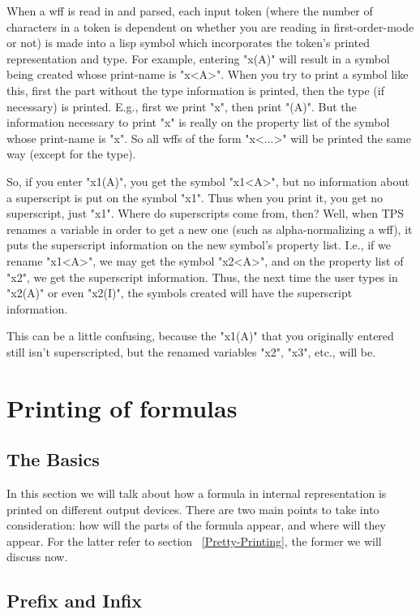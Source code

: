 When a wff is read in and parsed, each input token (where the number
of characters in a token is dependent on whether you are reading in
first-order-mode or not) is made into a lisp symbol which incorporates
the token's printed representation and type.  For example, entering
"x(A)" will result in a symbol being created whose print-name is
"x<A>".  When you try to print a symbol like this, first the part
without the type information is printed, then the type (if necessary)
is printed.  E.g., first we print "x", then print "(A)".  But the
information necessary to print "x" is really on the property list of
the symbol whose print-name is "x".  So all wffs of the form "x<...>"
will be printed the same way (except for the type).

So, if you enter "x1(A)", you get the symbol "x1<A>", but no
information about a superscript is put on the symbol "x1".  Thus when
you print it, you get no superscript, just "x1".  Where do
superscripts come from, then?  Well, when TPS renames a variable in
order to get a new one (such as alpha-normalizing a wff), it puts the
superscript information on the new symbol's property list.  I.e., if
we rename "x1<A>", we may get the symbol "x2<A>", and on the property
list of "x2", we get the superscript information.  Thus, the next time
the user types in "x2(A)" or even "x2(I)", the symbols created will
have the superscript information.

This can be a little confusing, because the "x1(A)" that you
originally entered still isn't superscripted, but the renamed
variables "x2", "x3", etc., will be.

\section{Printing of formulas}

\subsection{The Basics}

In this section we will talk about how a formula in internal representation
is printed on different output devices.  There are two main points
to take into consideration: how will the parts of the formula appear,
and where will they appear.  For the latter refer to section 
~\ref{Pretty-Printing}, the former we will discuss now.

\subsection{Prefix and Infix}

